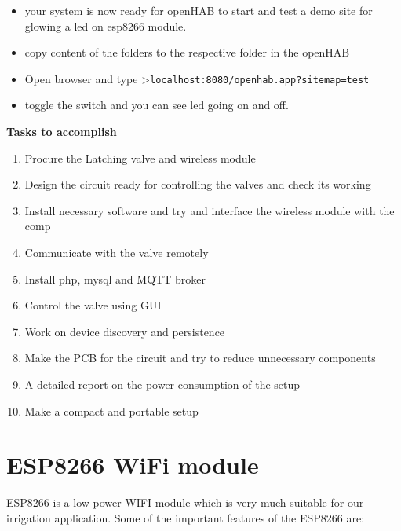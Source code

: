 \documentclass[16pt]{article}
\begin{document}
\begin{itemize}


\item your system is now ready for openHAB to start and test a demo site for
glowing a led on esp8266 module.
\item copy content of the folders to the
respective folder in the openHAB 
\item Open browser and type
\textgreater{}\texttt{localhost:8080/openhab.app?sitemap=test}
\item toggle
the switch and you can see led going on and off.

\end{itemize}


\hfill

{\Large{\textbf{Tasks to accomplish}}}

\begin{enumerate}

\item
  Procure the Latching valve and wireless module
\item
  Design the circuit ready for controlling the valves and check its
  working
\item
  Install necessary software and try and interface the wireless module
  with the comp
\item
  Communicate with the valve remotely
\item
  Install php, mysql and MQTT broker
\item
  Control the valve using GUI
\item
  Work on device discovery and persistence
\item
  Make the PCB for the circuit and try to reduce unnecessary components
\item
  A detailed report on the power consumption of the setup
\item
  Make a compact and portable setup
\end{enumerate}


\vspace{7cm}
\section{ESP8266 WiFi module}

\vspace{0.5cm}

ESP8266 is a low power WIFI module which is very much suitable for our
irrigation application. Some of the important features of the ESP8266
are:
\end{document}
